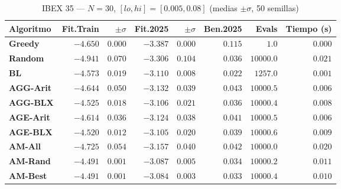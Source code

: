 \documentclass[12pt,a4paper]{article}
\begin{document}
\begin{table}[H]
\centering\footnotesize
\caption{IBEX 35 --- $N=30$, $[lo,hi]=[0.005,0.08]$ (medias $\pm\sigma$, 50 semillas)}
\begin{tabular}{lrrrrrr r}
\toprule
\textbf{Algoritmo} & \textbf{Fit.Train} & $\pm\sigma$ & \textbf{Fit.2025} & $\pm\sigma$ & \textbf{Ben.2025} & \textbf{Evals} & \textbf{Tiempo (s)} \\
\midrule
\textbf{Greedy}   & $-4.650$ & $0.000$ & $-3.387$ & $0.000$ & $0.115$ & $1.0$      & $0.000$ \\
\textbf{Random}   & $-4.941$ & $0.070$ & $-3.306$ & $0.104$ & $0.036$ & $10000.0$  & $0.021$ \\
\textbf{BL}       & $-4.573$ & $0.019$ & $-3.110$ & $0.008$ & $0.022$ & $1257.0$   & $0.001$ \\
\textbf{AGG-Arit} & $-4.644$ & $0.050$ & $-3.132$ & $0.039$ & $0.043$ & $10000.5$  & $0.006$ \\
\textbf{AGG-BLX}  & $-4.525$ & $0.018$ & $-3.106$ & $0.021$ & $0.036$ & $10000.4$  & $0.008$ \\
\textbf{AGE-Arit} & $-4.614$ & $0.036$ & $-3.124$ & $0.038$ & $0.041$ & $10000.5$  & $0.006$ \\
\textbf{AGE-BLX}  & $-4.520$ & $0.012$ & $-3.105$ & $0.020$ & $0.039$ & $10000.6$  & $0.009$ \\
\textbf{AM-All}   & $-4.725$ & $0.054$ & $-3.157$ & $0.040$ & $0.042$ & $10000.0$  & $0.020$ \\
\textbf{AM-Rand}  & $-4.491$ & $0.001$ & $-3.087$ & $0.005$ & $0.034$ & $10000.2$  & $0.011$ \\
\textbf{AM-Best}  & $-4.491$ & $0.001$ & $-3.084$ & $0.003$ & $0.033$ & $10000.4$  & $0.010$ \\
\bottomrule
\end{tabular}
\end{table}
\end{document}
